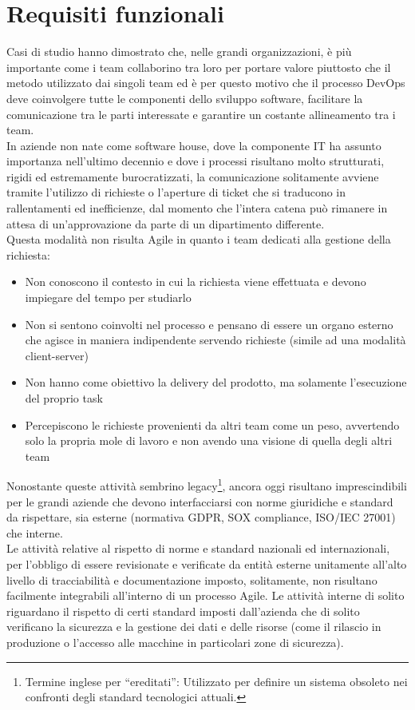 \documentclass[a4paper, 12pt]{report}
\numberwithin{equation}{section}
\begin{document}
\section{Requisiti funzionali}
Casi di studio hanno dimostrato che, nelle grandi organizzazioni, è più importante come i team collaborino tra loro per portare valore piuttosto che il metodo utilizzato dai singoli team \cite{gruver-agile} ed è per questo motivo che il processo DevOps deve coinvolgere tutte le componenti dello sviluppo software, facilitare la comunicazione tra le parti interessate e garantire un costante allineamento tra i team.\\
In aziende non nate come software house, dove la componente IT ha assunto importanza nell’ultimo decennio e dove i processi risultano molto strutturati, rigidi ed estremamente burocratizzati, la comunicazione solitamente avviene tramite l’utilizzo di richieste o l’aperture di ticket che si traducono in rallentamenti ed inefficienze, dal momento che l’intera catena può rimanere in attesa di un’approvazione da parte di un dipartimento differente. \\
Questa modalità non risulta Agile in quanto i team dedicati alla gestione della richiesta:
\begin{itemize}
    \item Non conoscono il contesto in cui la richiesta viene effettuata e devono impiegare del tempo per studiarlo
    \item Non si sentono coinvolti nel processo e pensano di essere un organo esterno che agisce in maniera indipendente servendo richieste (simile ad una modalità client-server)
    \item Non hanno come obiettivo la delivery del prodotto, ma solamente l’esecuzione del proprio task
    \item Percepiscono le richieste provenienti da altri team come un peso, avvertendo solo la propria mole di lavoro e non avendo una visione di quella degli altri team
\end{itemize}
Nonostante queste attività sembrino legacy\footnote{Termine inglese per “ereditati”: Utilizzato per definire un sistema obsoleto nei confronti degli standard tecnologici attuali.}, ancora oggi risultano imprescindibili per le grandi aziende che devono interfacciarsi con norme giuridiche e standard da rispettare, sia esterne (normativa GDPR, SOX compliance, ISO/IEC 27001) che interne.\\
Le attività relative al rispetto di norme e standard nazionali ed internazionali, per l’obbligo di essere revisionate e verificate da entità esterne unitamente all’alto livello di tracciabilità e documentazione imposto, solitamente, non risultano facilmente integrabili all’interno di un processo Agile. Le attività interne di solito riguardano il rispetto di certi standard imposti dall’azienda che di solito verificano la sicurezza e la gestione dei dati e delle risorse (come il rilascio in produzione o l’accesso alle macchine in particolari zone di sicurezza). \\
\end{document}

